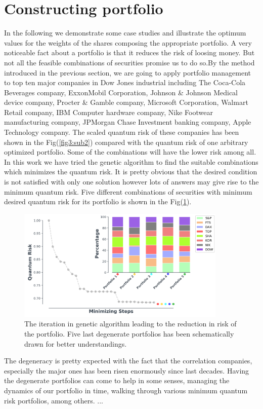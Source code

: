 \documentclass[ aip,jmp,reprint]{revtex4-2}
\begin{document}
\section{Constructing portfolio}
In the following we demonstrate some case studies and illustrate the optimum values for the weights of the shares composing the appropriate portfolio. A very noticeable fact about a portfolio is that it reduces the risk of loosing money. But not all the feasible combinations of securities promise us to do so.By the method introduced in the previous section, we are going to apply portfolio management to top ten major companies in Dow Jones industrial including The Coca-Cola Beverages company, ExxonMobil Corporation, Johnson \& Johnson Medical device company, Procter \& Gamble company, Microsoft Corporation, Walmart Retail company, IBM Computer hardware company, Nike Footwear manufacturing company, JPMorgan Chase Investment banking company, Apple Technology company. The scaled quantum risk of these companies has been shown in the Fig(\ref{fig3:sub2}) compared with the quantum risk of one arbitrary optimized portfolio.	
Some of the combinations will have the lower risk among all. In this work we have tried the genetic algorithm to find the suitable combinations which minimizes the quantum risk. 
It is pretty obvious that the desired condition is not satisfied with only one solution however lots of answers may give rise to the minimum quantum risk. Five different combinations of securities with minimum desired quantum risk for its portfolio is shown in the Fig(\ref{fig:2}).
\begin{figure}[htb]
	\centering
	\includegraphics[width=100mm]{fig6pr.png}
	\caption{The iteration in genetic algorithm leading to the reduction in risk of the portfolio. Five last degenerate portfolios has been schematically drawn for better understandings.}
	\label{fig:2}
\end{figure}
\newline
The degeneracy is pretty expected with the fact that the correlation companies, especially the major ones has been risen enormously since last decades. Having the degenerate portfolios can come to help in some senses, managing the dynamics of our portfolio in time, walking through various minimum quantum risk portfolios, among others. ... 
\newpage
\end{document}
